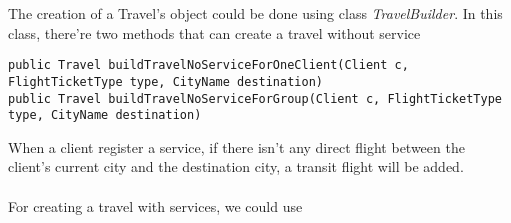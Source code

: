 The creation of a Travel's object could be done using class \textit{TravelBuilder}. In this class, there're two methods that can create a travel without service

\begin{lstlisting}
public Travel buildTravelNoServiceForOneClient(Client c, FlightTicketType type, CityName destination)
public Travel buildTravelNoServiceForGroup(Client c, FlightTicketType type, CityName destination)
\end{lstlisting}

When a client register a service, if there isn't any direct flight between the client's current city and the destination city, a transit flight will be added.  

\paragraph{}
For creating a travel with services, we could use

\begin{lstlisting}

\end{lstlisting}
